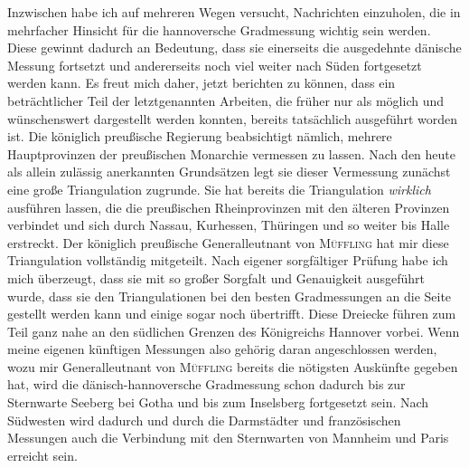 \par{}%
Inzwischen habe ich auf mehreren Wegen versucht, Nachrichten einzuholen, die in mehrfacher Hinsicht für die hannoversche Gradmessung wichtig sein werden. Diese gewinnt dadurch an Bedeutung, dass sie einerseits die ausgedehnte dänische Messung fortsetzt und andererseits noch viel weiter nach Süden fortgesetzt werden kann. Es freut mich daher, jetzt berichten zu können, dass ein beträchtlicher Teil der letztgenannten Arbeiten, die früher nur als möglich und wünschenswert dargestellt werden konnten, bereits tatsächlich ausgeführt worden ist. Die königlich preußische Regierung beabsichtigt nämlich, mehrere Hauptprovinzen der preußischen Monarchie vermessen zu lassen. Nach den heute als allein zulässig anerkannten Grundsätzen legt sie dieser Vermessung zunächst eine große Triangulation zugrunde. Sie hat bereits die Triangulation \textit{wirklich} ausführen lassen, die die preußischen Rheinprovinzen mit den älteren Provinzen verbindet und sich durch Nassau, Kurhessen, Thüringen und so weiter bis Halle erstreckt. Der königlich preußische Generalleutnant von \textsc{Müffling} hat mir diese Triangulation vollständig mitgeteilt. Nach eigener sorgfältiger Prüfung habe ich mich überzeugt, dass sie mit so großer Sorgfalt und Genauigkeit ausgeführt wurde, dass sie den Triangulationen bei den besten Gradmessungen an die Seite gestellt werden kann und einige sogar noch übertrifft. Diese Dreiecke führen zum Teil ganz nahe an den südlichen Grenzen des Königreichs Hannover vorbei. Wenn meine eigenen künftigen Messungen also gehörig daran angeschlossen werden, wozu mir Generalleutnant von \textsc{Müffling} bereits die nötigsten Auskünfte gegeben hat, wird die dänisch-hannoversche Gradmessung schon dadurch bis zur Sternwarte Seeberg bei Gotha und bis zum Inselsberg fortgesetzt sein. Nach Südwesten wird dadurch und durch die Darmstädter und französischen Messungen auch die Verbindung mit den Sternwarten von Mannheim und Paris erreicht sein.

